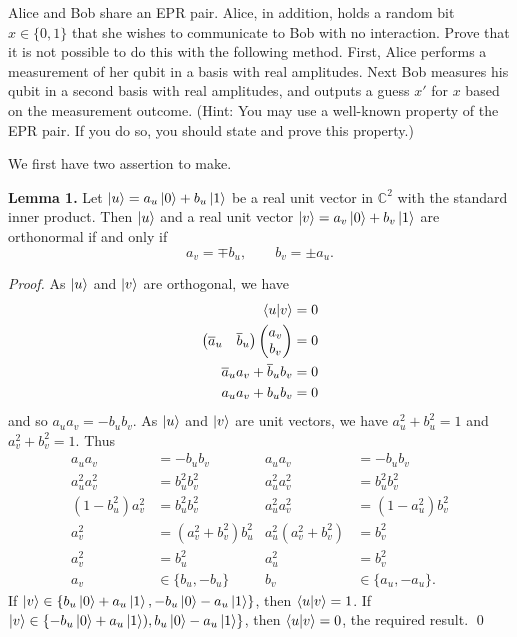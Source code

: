 \clearpage
\question[30] Alice and Bob share an EPR pair. Alice, in addition, holds a random bit $x \in \{0,1\}$ that she wishes to communicate to Bob with no interaction. Prove that it is not possible to do this with the following method. First, Alice performs a measurement of her qubit in a basis with real amplitudes. Next Bob measures his qubit in a second basis with real amplitudes, and outputs a guess $x'$ for $x$ based on the measurement outcome. (Hint: You may use a well-known property of the EPR pair. If you do so, you should state and prove this property.)

\begin{solution}
    We first have two assertion to make.

    \textbf{Lemma 1.} Let $\ket u =  a_u\ket 0 +  b_u \ket 1$ be a real unit vector in $\mathbb C^2$ with the standard inner product. Then $\ket u$ and a real unit vector $\ket v = a_v\ket0 + b_v\ket1$ are orthonormal if and only if
    \[  a_v = \mp  b_u, \qquad  b_v = \pm  a_u. \]

    \textit{Proof.} As $\ket u$ and $\ket v$ are orthogonal, we have
    \begin{align*}
        \braket{u|v}
                                              & = 0 \\
        \begin{pmatrix}
            \overline a_u & \overline b_u
        \end{pmatrix}
        \begin{pmatrix}
            a_v \\  b_v
        \end{pmatrix}
                                              & = 0 \\
        \overline a_u a_v + \overline b_u b_v & = 0 \\
        a_u a_v +  b_u b_v                    & = 0
    \end{align*}
    and so $ a_u a_v = - b_u b_v$. As $\ket u$ and $\ket v$ are unit vectors, we have $ a_u^2 +  b_u^2 = 1$ and $ a_v^2 +  b_v^2 = 1$. Thus
    \begin{align*}
        a_u a_v             & = - b_u b_v                & a_u a_v                & = - b_u b_v          \\
        a_u^2 a_v^2         & =  b_u^2 b_v^2             & a_u^2 a_v^2            & =  b_u^2 b_v^2       \\
        (1 -  b_u^2)  a_v^2 & =  b_u^2  b_v^2            & a_u^2 a_v^2            & = (1- a_u^2) b_v^2   \\
        a_v^2               & = ( a_v^2 +  b_v^2)  b_u^2 & a_u^2( a_v^2 +  b_v^2) & =  b_v^2             \\
        a_v^2               & =  b_u^2                   & a_u^2                  & =  b_v^2             \\
        a_v                 & \in \{ b_u, - b_u\}        & b_v                    & \in \{ a_u, - a_u\}.
    \end{align*}
    If $\ket v \in \{b_u\ket0 + a_u\ket1, -b_u\ket0 -a_u\ket1\}$, then $\braket{u|v} = 1$. If $\ket v \in \{- b_u \ket0 + a_u\ket1),b_u\ket0 - a_u\ket1\}$, then $\braket{u|v} = 0$, the required result. \qed


\end{solution}
